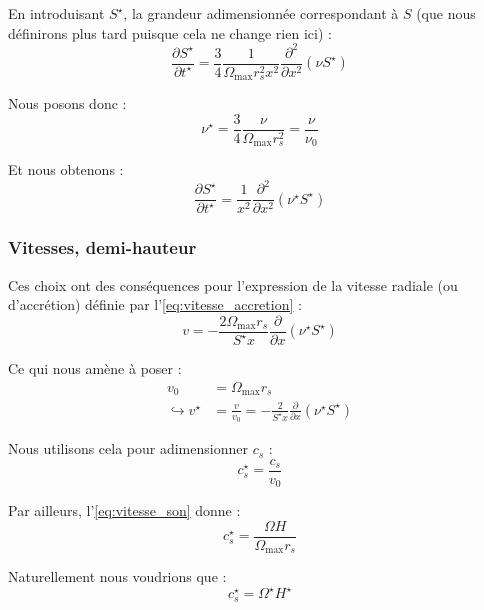 En introduisant $S^\star$, la grandeur adimensionnée correspondant à $S$ (que
nous définirons plus tard puisque cela ne change rien ici) :
\begin{equation}
    \frac{\partial S^\star}{\partial t^\star} = \frac{3}{4} \frac{1}{\Omega_\mathrm{max} r_s^2 x^2} \frac{\partial^2}{\partial x^2} \left(\nu S^\star\right)
\end{equation}

Nous posons donc :
\begin{equation}
    \nu^\star = \frac{3}{4} \frac{\nu}{\Omega_\mathrm{max} r_s^2} = \frac{\nu}{\nu_0}
\end{equation}

Et nous obtenons :
\begin{equation}
    \frac{\partial S^\star}{\partial t^\star} = \frac{1}{x^2} \frac{\partial^2}{\partial x^2} \left(\nu^\star S^\star\right)
\end{equation}

\subsubsection{Vitesses, demi-hauteur}

Ces choix ont des conséquences pour l’expression de la vitesse radiale (ou
d’accrétion) définie par l’\cref{eq:vitesse_accretion} :
\begin{equation}
    v = - \frac{2 \Omega_\mathrm{max} r_s}{S^\star x} \frac{\partial}{\partial x} \left(\nu^\star S^\star\right)
\end{equation}

Ce qui nous amène à poser :
\begin{align}
    v_0 &= \Omega_\mathrm{max} r_s \\
    \hookrightarrow v^\star &= \frac{v}{v_0} = - \frac{2}{S^\star x} \frac{\partial}{\partial x} \left(\nu^\star S^\star\right)
\end{align}

Nous utilisons cela pour adimensionner $c_s$ :
\begin{equation}
    c_s^\star = \frac{c_s}{v_0}
\end{equation}

Par ailleurs, l’\cref{eq:vitesse_son} donne :
\begin{equation}
    c_s^\star = \frac{\Omega H}{\Omega_\mathrm{max} r_s}
\end{equation}

Naturellement nous voudrions que :
\begin{equation}
    c_s^\star = \Omega^\star H^\star
\end{equation}

